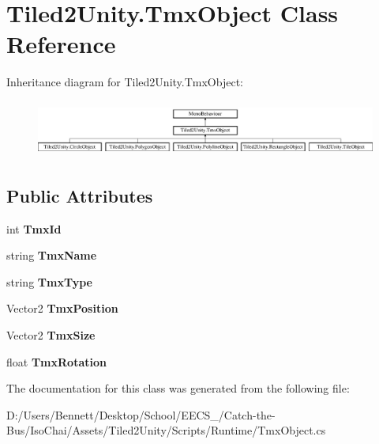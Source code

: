 \hypertarget{class_tiled2_unity_1_1_tmx_object}{}\section{Tiled2\+Unity.\+Tmx\+Object Class Reference}
\label{class_tiled2_unity_1_1_tmx_object}
Inheritance diagram for Tiled2\+Unity.\+Tmx\+Object\+:\begin{figure}[H]
\begin{center}
\leavevmode
\includegraphics[height=1.877095cm]{class_tiled2_unity_1_1_tmx_object}
\end{center}
\end{figure}
\subsection*{Public Attributes}
\begin{DoxyCompactItemize}
\item 
\mbox{\label{class_tiled2_unity_1_1_tmx_object_af523fddb695142cbb86c0eaca115e883}} 
int {\bfseries Tmx\+Id}
\item 
\mbox{\label{class_tiled2_unity_1_1_tmx_object_a865abf541cffb969b3650374a07acb64}} 
string {\bfseries Tmx\+Name}
\item 
\mbox{\label{class_tiled2_unity_1_1_tmx_object_a1ebc9e3f4e1678dcf293df85e8412c1d}} 
string {\bfseries Tmx\+Type}
\item 
\mbox{\label{class_tiled2_unity_1_1_tmx_object_a5d89cb3b0c2258059062fed163c49942}} 
Vector2 {\bfseries Tmx\+Position}
\item 
\mbox{\label{class_tiled2_unity_1_1_tmx_object_aa5516a13f4916bb09dbc25014505d03f}} 
Vector2 {\bfseries Tmx\+Size}
\item 
\mbox{\label{class_tiled2_unity_1_1_tmx_object_a580117e9008c354b82ffb7d8656af51d}} 
float {\bfseries Tmx\+Rotation}
\end{DoxyCompactItemize}


The documentation for this class was generated from the following file\+:\begin{DoxyCompactItemize}
\item 
D\+:/\+Users/\+Bennett/\+Desktop/\+School/\+E\+E\+C\+S\+\_/\+Catch-\/the-\/\+Bus/\+Iso\+Chai/\+Assets/\+Tiled2\+Unity/\+Scripts/\+Runtime/Tmx\+Object.\+cs\end{DoxyCompactItemize}
